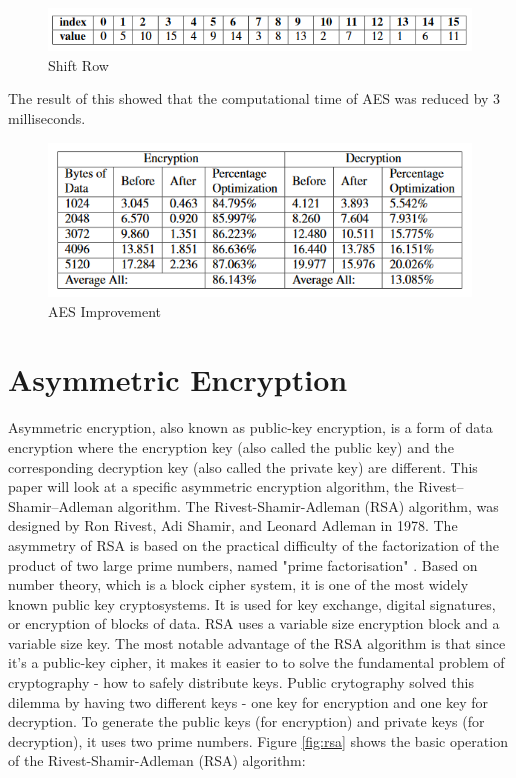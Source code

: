 \documentclass[journal]{IEEEtran}
\begin{document}
\newline
\begin{figure}[!h]
    \centering
    \includegraphics[scale=.5]{shift_row}
    \caption{Shift Row}
    \label{fig:aes_times}
\end{figure}

The result of this showed that the computational time of AES was reduced by 3 milliseconds. 

\newline
\begin{figure}[!h]
    \centering
    \includegraphics[scale=.7]{aes_improvement}
    \caption{AES Improvement}
    \label{fig:aes_times}
\end{figure}

\section{\textbf{Asymmetric Encryption}}
Asymmetric encryption, also known as public-key encryption, is a form of data encryption where the encryption key (also called the public key) and the corresponding decryption key (also called the private key) are different. This paper will look at a specific asymmetric encryption algorithm, the Rivest–Shamir–Adleman algorithm. The Rivest-Shamir-Adleman (RSA) algorithm, was designed by Ron Rivest, Adi Shamir, and Leonard Adleman in 1978. The asymmetry of RSA is based on the practical difficulty of the factorization of the product of two large prime numbers, named "prime factorisation" \cite{prime_factorization}. Based on number theory, which is a block cipher system, it is one of the most widely known public key cryptosystems. It is used for key exchange, digital signatures, or encryption of blocks of data. RSA uses a variable size encryption block and a variable size key. The most notable advantage of the RSA algorithm is that since it's a public-key cipher, it makes it easier to to solve the fundamental problem of cryptography - how to safely distribute keys. Public crytography solved this dilemma by having two different keys - one key for encryption and one key for decryption. To generate the public keys (for encryption) and private keys (for decryption), it uses two prime numbers. Figure \ref{fig:rsa} shows the basic operation of the Rivest-Shamir-Adleman (RSA) algorithm:
\end{document}
